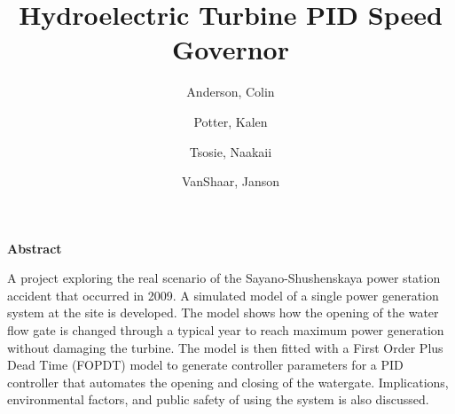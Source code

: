 \documentclass{article}
\title{Hydroelectric Turbine PID Speed Governor}
\author{
    Anderson, Colin
    \and
    Potter, Kalen
    \and
    Tsosie, Naakaii
    \and
    VanShaar, Janson
}
\date{}
\begin{document}
    \maketitle

    \thispagestyle{plain}
    
    \noindent\makebox[\linewidth]{\rule{\textwidth}{0.4pt}}

    \begin{center}
        \textbf{Abstract}
    \end{center}


    A project exploring the real scenario of the Sayano-Shushenskaya power station accident that occurred in 2009.  A simulated model of a single power generation system at the site is developed. The model shows how the opening of the water flow gate is changed through a typical year to reach maximum power generation without damaging the turbine.  The model is then fitted with a First Order Plus Dead Time (FOPDT) model to generate controller parameters for a PID controller that automates the opening and closing of the watergate.  Implications, environmental factors, and public safety of using the system is also discussed.

    \noindent\makebox[\linewidth]{\rule{\textwidth}{0.4pt}}
\end{document}
